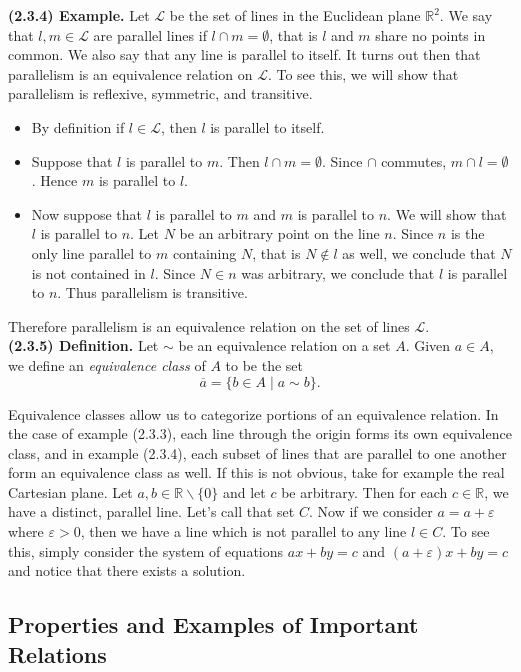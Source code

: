 \documentclass[12pt]{book}
\def\R{{\mathbb{R}}}
\def\eq[#1]{{\overline{#1}}}
\def\cL{{\mathcal{L}}}
\begin{document}
\noindent\textbf{(2.3.4) Example.} Let $\cL$ be the set of lines in the Euclidean plane $\R^2$. We say that $l,m\in\cL$ are parallel lines if $l\cap m=\emptyset$, that is $l$ and $m$ share no points in common. We also say that any line is parallel to itself. It turns out then that parallelism is an equivalence relation on $\cL$. To see this, we will show that parallelism is reflexive, symmetric, and transitive. 
\begin{itemize}
\item By definition if $l\in\cL$, then $l$ is parallel to itself.
\item Suppose that $l$ is parallel to $m$. Then $l\cap m=\emptyset$. Since $\cap$ commutes, $m\cap l=\emptyset$. Hence $m$ is parallel to $l$.
\item Now suppose that $l$ is parallel to $m$ and $m$ is parallel to $n$. We will show that $l$ is parallel to $n$. Let $N$ be an arbitrary point on the line $n$. Since $n$ is the only line parallel to $m$ containing $N$, that is $N\notin l$ as well, we conclude that $N$ is not contained in $l$. Since $N\in n$ was arbitrary, we conclude that $l$ is parallel to $n$. Thus parallelism is transitive.
\end{itemize}
Therefore parallelism is an equivalence relation on the set of lines $\cL$.\\

\noindent\textbf{(2.3.5) Definition.} Let $\sim$ be an equivalence relation on a set $A$. Given $a\in A$, we define an \textit{equivalence class} of $A$ to be the set
\[\eq[a]=\{b\in A\mid a\sim b\}.\]

Equivalence classes allow us to categorize portions of an equivalence relation. In the case of example (2.3.3), each line through the origin forms its own equivalence class, and in example (2.3.4), each subset of lines that are parallel to one another form an equivalence class as well. If this is not obvious, take for example the real Cartesian plane. Let $a,b\in\R\backslash\{0\}$ and let $c$ be arbitrary. Then for each $c\in\R$, we have a distinct, parallel line. Let's call that set $C$. Now if we consider $a=a+\varepsilon$ where $\varepsilon>0$, then we have a line which is not parallel to any line $l\in C$. To see this, simply consider the system of equations $ax+by=c$ and $(a+\varepsilon)x+by=c$ and notice that there exists a solution.

\subsection*{Properties and Examples of Important Relations}
\end{document}
